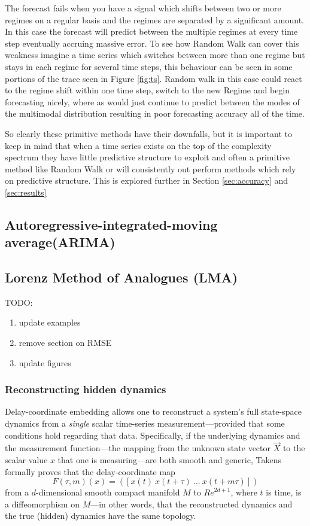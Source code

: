 The \naive forecast fails when you have a signal which shifts between two or more regimes on a regular basis and the regimes are separated by a significant amount. In this case the \naive forecast will predict between the multiple regimes at every time step eventually accruing massive error. To see how Random Walk can cover this weakness imagine a time series which switches between more than one regime but stays in each regime for several time steps, this behaviour can be seen in some portions of the \svd trace seen in Figure \ref{fig:ts}. Random walk in this case could react to the regime shift within one time step, switch to the new Regime and begin forecasting nicely, where as \naive would just continue to predict between the modes of the multimodal distribution resulting in poor forecasting accuracy all of the time. 

So clearly these primitive methods have their downfalls, but it is important to keep in mind that when a time series exists on the top of the complexity spectrum they have little predictive structure to exploit and often a primitive method like Random Walk or \naive will consistently out perform methods which rely on predictive structure. This is explored further in Section \ref{sec:accuracy} and \ref{sec:results}


\subsection{Autoregressive-integrated-moving average(ARIMA)}\label{sec:arima}



\subsection{Lorenz Method of Analogues (LMA)}\label{sec:lma}
TODO:
\begin{enumerate}
\item update examples
\item remove section on RMSE
\item update figures
\end{enumerate}


 \subsubsection{Reconstructing hidden dynamics}



Delay-coordinate embedding allows one to reconstruct a system's full
state-space dynamics from a \emph{single} scalar time-series
measurement---provided that some conditions hold regarding that data.
Specifically, if the underlying dynamics and the measurement
function---the mapping from the unknown state vector $\vec{X}$ to the
scalar value $x$ that one is measuring---are both smooth and generic,
Takens~\cite{takens} formally proves that the delay-coordinate map
\[
F(\tau,m)(x) = ([x(t) ~ x(t+\tau) ~ \dots ~x(t+m\tau)])
\]
from a $d$-dimensional smooth compact manifold $M$ to ${Re}^{2d+1}$,
where $t$ is time, is a diffeomorphism on $M$---in other words, that
the reconstructed dynamics and the true (hidden) dynamics have the
same topology.


